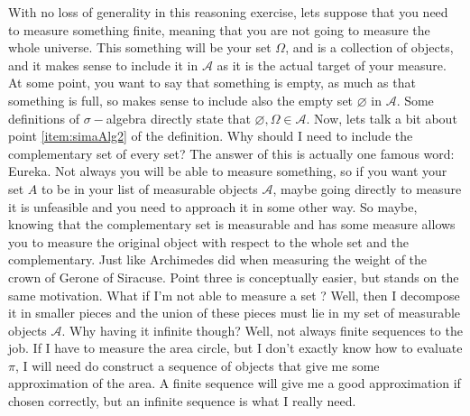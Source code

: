 {With no loss of generality in this reasoning exercise, lets suppose that you need to measure something finite, meaning that you are not going to measure the whole universe. This something will be your set $\Omega$, and is a collection of objects, and it makes sense to include it in $\mathscr{A}$ as it is the actual target of your measure. At some point, you want to say that something is empty, as much as that something is full, so makes sense to include also the empty set $\varnothing$ in $\mathscr{A}$. Some definitions of $\sigma-$algebra directly state that $\varnothing,\Omega\in\mathscr{A}$. Now, lets talk a bit about point \ref{item:simaAlg2} of the definition. Why should I need to include the complementary set of every set? The answer of this is actually one famous word: Eureka. Not always you will be able to measure something, so if you want your set $A$ to be in your list of measurable objects $\mathscr{A}$, maybe going directly to measure it is unfeasible and you need to approach it in some other way. So maybe, knowing that the complementary set is measurable and has some measure allows you to measure the original object with respect to the whole set and the complementary. Just like Archimedes did when measuring the weight of the crown of Gerone of Siracuse. Point three is conceptually easier, but stands on the same motivation. What if I'm not able to measure a set ? Well, then I decompose it in smaller pieces and the union of these pieces must lie in my set of measurable objects $\mathscr{A}$. Why having it infinite though? Well, not always finite sequences to the job. If I have to measure the area circle, but I don't exactly know how to evaluate $\pi$, I will need do construct a sequence of objects that give me some approximation of the area. A finite sequence will give me a good approximation if chosen correctly, but an infinite sequence is what I really need.} 
